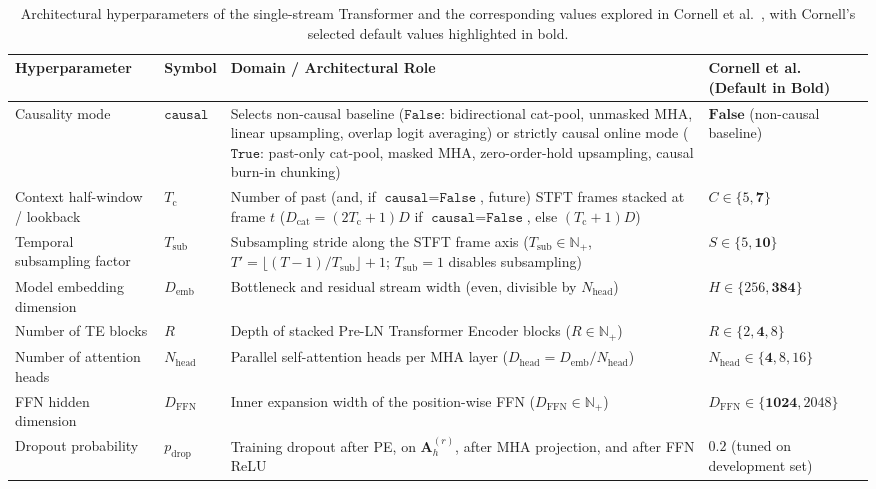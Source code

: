\documentclass[lettersize,journal]{IEEEtran}
\begin{document}
\begin{table}[t]
  \centering
  \caption{Architectural hyperparameters of the single-stream Transformer and the corresponding values explored in Cornell et al.~\cite{cornell2022overlapped}, with Cornell's selected default values highlighted in bold.}
  \label{tab:transformer_hyperparams}
  \begin{tabular}{@{}llp{}l@{}}
    \toprule
    \textbf{Hyperparameter} & \textbf{Symbol} & \textbf{Domain / Architectural Role} & \textbf{Cornell et al.~\cite{cornell2022overlapped} (Default in Bold)} \\
    \midrule
    Causality mode & $\texttt{causal}$ & Selects non-causal baseline ($\texttt{False}$: bidirectional cat-pool, unmasked \acrshort{MHA}, linear upsampling, overlap logit averaging) or strictly causal online mode ($\texttt{True}$: past-only cat-pool, masked \acrshort{MHA}, zero-order-hold upsampling, causal burn-in chunking) & $\mathbf{False}$ (non-causal baseline) \\
    Context half-window / lookback & $T_{\mathrm{c}}$ & Number of past (and, if $\texttt{causal}=\texttt{False}$, future) \acrshort{STFT} frames stacked at frame $t$ ($D_{\mathrm{cat}} = (2T_{\mathrm{c}}+1)D$ if $\texttt{causal}=\texttt{False}$, else $(T_{\mathrm{c}}+1)D$) & $C \in \{5, \mathbf{7}\}$ \\
    Temporal subsampling factor & $T_{\mathrm{sub}}$ & Subsampling stride along the \acrshort{STFT} frame axis ($T_{\mathrm{sub}} \in \mathbb{N}_+$, $T' = \lfloor (T-1)/T_{\mathrm{sub}} \rfloor + 1$; $T_{\mathrm{sub}} = 1$ disables subsampling) & $S \in \{5, \mathbf{10}\}$ \\
    Model embedding dimension & $D_{\mathrm{emb}}$ & Bottleneck and residual stream width (even, divisible by $N_{\mathrm{head}}$) & $H \in \{256, \mathbf{384}\}$ \\
    Number of \acrshort{TE} blocks & $R$ & Depth of stacked Pre-\acrshort{LN} Transformer Encoder blocks ($R \in \mathbb{N}_+$) & $R \in \{2, \mathbf{4}, 8\}$ \\
    Number of attention heads & $N_{\mathrm{head}}$ & Parallel self-attention heads per \acrshort{MHA} layer ($D_{\mathrm{head}} = D_{\mathrm{emb}} / N_{\mathrm{head}}$) & $N_{\mathrm{head}} \in \{\mathbf{4}, 8, 16\}$ \\
    \acrshort{FFN} hidden dimension & $D_{\mathrm{FFN}}$ & Inner expansion width of the position-wise \acrshort{FFN} ($D_{\mathrm{FFN}} \in \mathbb{N}_+$) & $D_{\mathrm{FFN}} \in \{\mathbf{1024}, 2048\}$ \\
    Dropout probability & $p_{\mathrm{drop}}$ & Training dropout after \acrshort{PE}, on $\mathbf{A}_h^{(r)}$, after \acrshort{MHA} projection, and after \acrshort{FFN} \acrshort{ReLU} & $\mathbf{0.2}$ (tuned on development set) \\
    \bottomrule
  \end{tabular}
\end{table}
\end{document}
